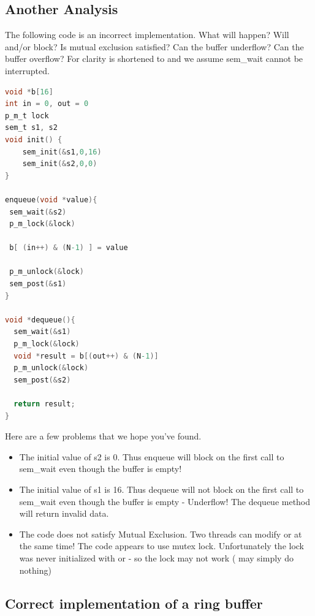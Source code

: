 \subsection{Another Analysis}

The following code is an incorrect implementation.
What will happen?
Will  and/or  block?
Is mutual exclusion satisfied?
Can the buffer underflow?
Can the buffer overflow?
For clarity  is shortened to  and we assume sem\_wait cannot be interrupted.

\begin{lstlisting}[language=C]
void *b[16]
int in = 0, out = 0
p_m_t lock
sem_t s1, s2
void init() {
    sem_init(&s1,0,16)
    sem_init(&s2,0,0)
}

enqueue(void *value){
 sem_wait(&s2)
 p_m_lock(&lock)

 b[ (in++) & (N-1) ] = value

 p_m_unlock(&lock)
 sem_post(&s1)
}

void *dequeue(){
  sem_wait(&s1)
  p_m_lock(&lock)
  void *result = b[(out++) & (N-1)]
  p_m_unlock(&lock)
  sem_post(&s2)

  return result;
}
\end{lstlisting}

Here are a few problems that we hope you've found.

\begin{itemize}
\tightlist
\item
  The initial value of s2 is 0.
  Thus enqueue will block on the first call to sem\_wait even though the buffer is empty!
\item
  The initial value of s1 is 16.
  Thus dequeue will not block on the first call to sem\_wait even though the buffer is empty - Underflow!
  The dequeue method will return invalid data.
\item
  The code does not satisfy Mutual Exclusion.
  Two threads can modify  or  at the same time!
  The code appears to use mutex lock. Unfortunately the lock was never initialized with  or  - so the lock may not work ( may simply do nothing)
\end{itemize}

\subsection{Correct implementation of a ring buffer}

